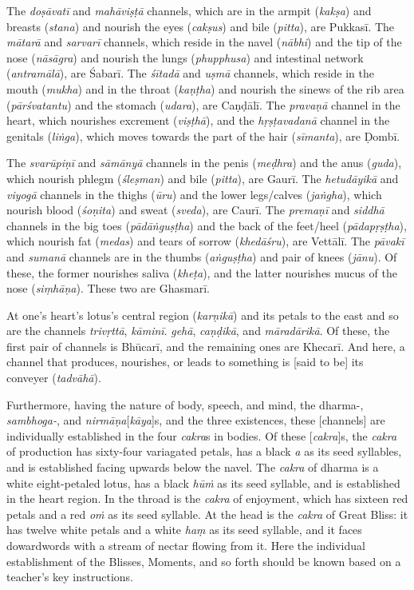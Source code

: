 \documentclass[naipra.tex]{subfiles}
\begin{document}
The \emph{doṣāvatī} and \emph{mahāviṣṭā} channels, which are in the armpit (\emph{kakṣa}) and breasts (\emph{stana}) and nourish the eyes (\emph{cakṣus}) and bile (\emph{pitta}), are Pukkasī.
The \emph{mātarā} and \emph{sarvarī} channels, which reside in the navel (\emph{nābhi}) and the tip of the nose (\emph{nāsāgra}) and nourish the lungs (\emph{phupphusa}) and intestinal network (\emph{antramālā}), are Śabarī.
The \emph{śītadā} and \emph{uṣmā} channels, which reside in the mouth (\emph{mukha}) and in the throat (\emph{kaṇṭha}) and nourish the sinews of the rib area (\emph{pārśvatantu}) and the stomach (\emph{udara}), are Caṇḍālī.
The \emph{pravaṇā} channel in the heart, which nourishes excrement (\emph{viṣṭhā}), and the \emph{hṛṣṭavadanā} channel in the genitals (\emph{liṅga}), which moves towards the part of the hair (\emph{sīmanta}), are Ḍombī.

The \emph{svarūpiṇī} and \emph{sāmānyā} channels in the penis (\emph{meḍhra}) and the anus (\emph{guda}), which nourish phlegm (\emph{śleṣman}) and bile (\emph{pitta}), are Gaurī.
The \emph{hetudāyikā} and \emph{viyogā} channels in the thighs (\emph{ūru}) and the lower legs/calves (\emph{jaṅgha}), which nourish blood (\emph{śoṇita}) and sweat (\emph{sveda}), are Caurī.
The \emph{premaṇī} and \emph{siddhā} channels in the big toes (\emph{pādāṅguṣṭha}) and the back of the feet/heel (\emph{pādapṛṣṭha}), which nourish fat (\emph{medas}) and tears of sorrow (\emph{khedāśru}), are Vettālī.
The \emph{pāvakī} and \emph{sumanā} channels are in the thumbs (\emph{aṅguṣṭha}) and pair of knees (\emph{jānu}).
Of these, the former nourishes saliva (\emph{kheṭa}), and the latter nourishes mucus of the nose (\emph{siṃhāṇa}).
These two are Ghasmarī.

At one's heart's lotus's central region (\emph{karṇikā}) and its petals to the east and so are the channels \emph{trivṛttā}, \emph{kāminī}. \emph{gehā}, \emph{caṇḍikā}, and \emph{māradārikā}.
Of these, the first pair of channels is Bhūcarī, and the remaining ones are Khecarī.
And here, a channel that produces, nourishes, or leads to something is [said to be] its conveyer (\emph{tadvāhā}).

Furthermore, having the nature of body, speech, and mind, the dharma-, \emph{sambhoga-}, and \emph{nirmāṇa}[\emph{kāya}]s, and the three existences, these [channels] are individually established in the four \emph{cakra}s in bodies.
Of these [\emph{cakra}]s, the \emph{cakra} of production has sixty-four variagated petals, has a black \emph{a} as its seed syllables, and is established facing upwards below the navel.
The \emph{cakra} of dharma is a white eight-petaled lotus, has a black \emph{hūṁ} as its seed syllable, and is established in the heart region.
In the throad is the \emph{cakra} of enjoyment, which has sixteen red petals and a red \emph{oṁ} as its seed syllable.
At the head is the \emph{cakra} of Great Bliss: it has twelve white petals and a white \emph{haṃ} as its seed syllable, and it faces dowardwords with a stream of nectar flowing from it.
Here the individual establishment of the Blisses, Moments, and so forth should be known based on a teacher's key instructions.
\end{document}
